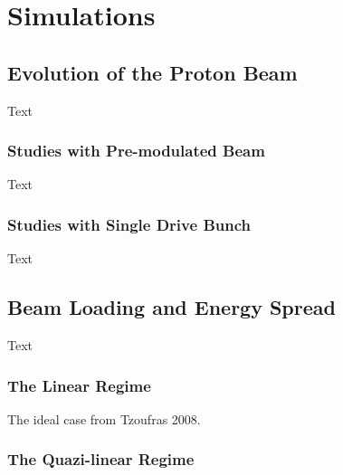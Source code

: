 %
%

\chapter{Simulations}
\label{Ch:Sim}

\section{Evolution of the Proton Beam}
\label{Sim:PBeam}

Text

\subsection{Studies with Pre-modulated Beam}
\label{Sim:PBPreMod}

Text

\subsection{Studies with Single Drive Bunch}
\label{Sim:PBSingle}

Text

\section{Beam Loading and Energy Spread}
\label{Sim:BLoad}

Text

\subsection{The Linear Regime}
\label{Sim:Lin}

The ideal case from Tzoufras 2008.

\subsection{The Quazi-linear Regime}
\label{Sim:QLin}

